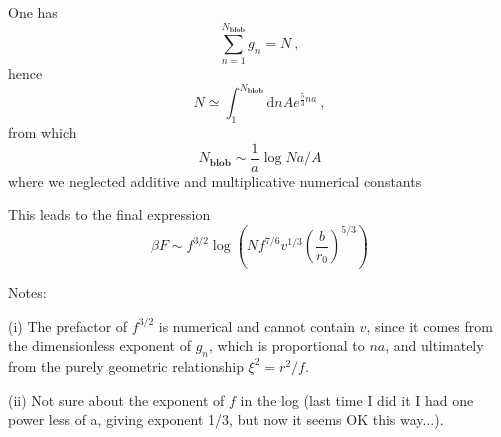 \documentclass[
preprint,
a4paper,
12pt,
superscriptaddress,
pre]{revtex4}
\begin{document}
One has
\begin{displaymath}
  \sum_{n=1}^{N_{\mathbf{blob}}} g_n = N \ ,
\end{displaymath}
hence
\begin{displaymath}
  N \simeq \int_{1}^{N_{\mathbf{blob}}} \mathrm{d}n  A e^{\frac{5}{3}n
    a} \ , 
\end{displaymath}
from which
\begin{displaymath}
  N_{\mathbf{blob}} \sim \frac{1}{a} \log N a / A
\end{displaymath}
where we neglected additive and multiplicative numerical constants

This leads to the final expression
\begin{displaymath}
  \beta F \sim f^{3/2} \log 
  \left(  N f^{7/6} v^{1/3}  \left(\frac{b}{r_0} \right)^{5/3} \right)
\end{displaymath}

Notes:

(i) The prefactor of $f^{3/2}$ is numerical and cannot contain $v$,
since it comes from the dimensionless exponent of $g_n$, which is
proportional to $n a$, and ultimately from the purely geometric
relationship $\xi^2 = r^2/f$.

(ii) Not sure about the exponent of $f$ in the log (last time I did it
I had one power less of a, giving exponent 1/3, but now it seems OK
this way...).

\end{document}
